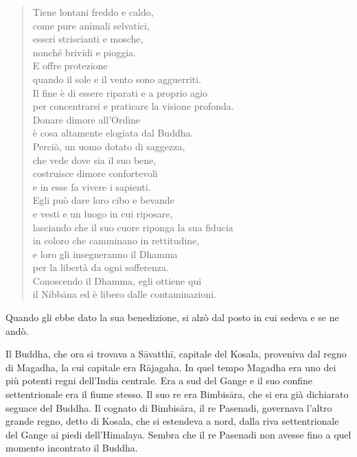 \begin{quote}
Tiene lontani freddo e caldo, \\
come pure animali selvatici, \\
esseri striscianti e mosche, \\
nonché brividi e pioggia. \\
E offre protezione \\
quando il sole e il vento sono agguerriti. \\
Il fine è di essere riparati e a proprio agio \\
per concentrarsi e praticare la visione profonda. \\
Donare dimore all’Ordine \\
è cosa altamente elogiata dal Buddha. \\
Perciò, un uomo dotato di saggezza, \\
che vede dove sia il suo bene, \\
costruisce dimore confortevoli \\
e in esse fa vivere i sapienti. \\
Egli può dare loro cibo e bevande \\
e vesti e un luogo in cui riposare, \\
lasciando che il suo cuore riponga la sua fiducia \\
in coloro che camminano in rettitudine, \\
e loro gli insegneranno il Dhamma \\
per la libertà da ogni sofferenza. \\
Conoscendo il Dhamma, egli ottiene qui \\
il Nibbāna ed è libero dalle contaminazioni.
\end{quote}

Quando gli ebbe dato la sua benedizione, si alzò dal posto in cui sedeva e se ne
andò.


 Il Buddha, che ora si trovava a Sāvatthī, capitale
del Kosala, proveniva dal regno di Magadha, la cui capitale era Rājagaha. In
quel tempo Magadha era uno dei più potenti regni dell’India centrale. Era a sud
del Gange e il suo confine settentrionale era il fiume stesso. Il suo re era
Bimbisāra, che si era già dichiarato seguace del Buddha. Il cognato di
Bimbisāra, il re Pasenadi, governava l’altro grande regno, detto di Kosala, che
si estendeva a nord, dalla riva settentrionale del Gange ai piedi dell’Himalaya.
Sembra che il re Pasenadi non avesse fino a quel momento incontrato il Buddha.

